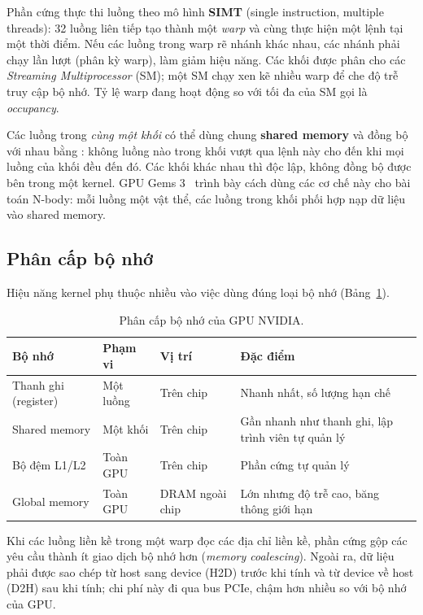 Phần cứng thực thi luồng theo mô hình \textbf{SIMT} (single instruction, multiple threads): 32 luồng liên tiếp tạo thành một \emph{warp} và cùng thực hiện một lệnh tại một thời điểm. Nếu các luồng trong warp rẽ nhánh khác nhau, các nhánh phải chạy lần lượt (phân kỳ warp), làm giảm hiệu năng. Các khối được phân cho các \emph{Streaming Multiprocessor} (SM); một SM chạy xen kẽ nhiều warp để che độ trễ truy cập bộ nhớ. Tỷ lệ warp đang hoạt động so với tối đa của SM gọi là \emph{occupancy}.

Các luồng trong \emph{cùng một khối} có thể dùng chung \textbf{shared memory} và đồng bộ với nhau bằng : không luồng nào trong khối vượt qua lệnh này cho đến khi mọi luồng của khối đều đến đó. Các khối khác nhau thì độc lập, không đồng bộ được bên trong một kernel. GPU Gems 3~\cite{gpugems3} trình bày cách dùng các cơ chế này cho bài toán N-body: mỗi luồng một vật thể, các luồng trong khối phối hợp nạp dữ liệu vào shared memory.

\subsection{Phân cấp bộ nhớ}

Hiệu năng kernel phụ thuộc nhiều vào việc dùng đúng loại bộ nhớ (Bảng~\ref{tab:bo-nho-gpu}).

\begin{table}[H]
\centering\small
\begin{tabular}{p{3.4cm}p{2.1cm}p{2.6cm}p{6.2cm}}
\toprule
\textbf{Bộ nhớ} & \textbf{Phạm vi} & \textbf{Vị trí} & \textbf{Đặc điểm} \\
\midrule
Thanh ghi (register) & Một luồng & Trên chip & Nhanh nhất, số lượng hạn chế \\
Shared memory & Một khối & Trên chip & Gần nhanh như thanh ghi, lập trình viên tự quản lý \\
Bộ đệm L1/L2 & Toàn GPU & Trên chip & Phần cứng tự quản lý \\
Global memory & Toàn GPU & DRAM ngoài chip & Lớn nhưng độ trễ cao, băng thông giới hạn \\
\bottomrule
\end{tabular}
\caption{Phân cấp bộ nhớ của GPU NVIDIA.}
\label{tab:bo-nho-gpu}
\end{table}

Khi các luồng liền kề trong một warp đọc các địa chỉ liền kề, phần cứng gộp các yêu cầu thành ít giao dịch bộ nhớ hơn (\emph{memory coalescing}). Ngoài ra, dữ liệu phải được sao chép từ host sang device (H2D) trước khi tính và từ device về host (D2H) sau khi tính; chi phí này đi qua bus PCIe, chậm hơn nhiều so với bộ nhớ của GPU.

